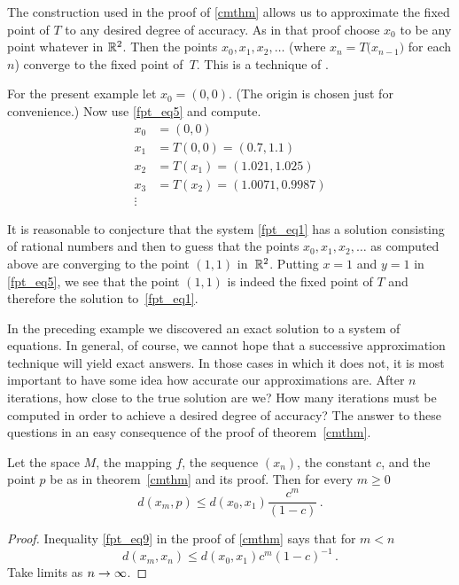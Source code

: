\begin{exam}
The construction used in the proof of \ref{cmthm} allows us to approximate the fixed point of $T$
to any desired degree of accuracy.  As in that proof choose $x_0$ to be any point whatever in
$\mathbb{R}^2$.  Then the points $x_0,x_1,x_2,\dots$ (where $x_n = T\bigl(x_{n-1}\bigr)$ for each $n$)
converge to the fixed point of~$T$.  This is a technique of
.

For the present example let $x_0 = (0,0)$.  (The origin is chosen just for convenience.)  Now use
\eqref{fpt_eq5} and compute.
  \begin{align*}
           x_0 &= (0,0) \\
           x_1 &= T(0,0) = (0.7,1.1) \\
           x_2 &= T(x_1) = (1.021, 1.025) \\
           x_3 &= T(x_2) = (1.0071, 0.9987) \\
        \vdots &{}
  \end{align*}

It is reasonable to conjecture that the system \eqref{fpt_eq1} has a solution consisting of
rational numbers and then to guess that the points $x_0,x_1,x_2,\dots$ as computed above are
converging to the point $(1,1)$ in~$\mathbb{R}^2$.  Putting $x=1$ and $y=1$ in \eqref{fpt_eq5}, we see that
the point $(1,1)$ is indeed the fixed point of $T$ and therefore the solution to~\eqref{fpt_eq1}.
\end{exam}

In the preceding example we discovered an exact solution to a system of equations.  In general, of
course, we cannot hope that a successive approximation technique will yield exact answers.  In
those cases in which it does not, it is most important to have some idea how accurate our
approximations are.  After $n$ iterations, how close to the true solution are we?  How many
iterations must be computed in order to achieve a desired degree of accuracy?  The answer to these
questions in an easy consequence of the proof of theorem~\ref{cmthm}.

\begin{cor}\label{error1} Let the space $M$, the mapping $f$, the sequence $(x_n)$, the constant $c$,
and the point $p$ be as in theorem~\ref{cmthm} and its proof.  Then for every $m \ge 0$
  \[ d(x_m,p) \le d(x_0,x_1)\frac{c^m}{(1 - c)}\,. \]
\end{cor}

\begin{proof} Inequality \eqref{fpt_eq9} in the proof of \ref{cmthm} says that for $m < n$
  \[ d(x_m,x_n) \le d(x_0,x_1)c^m (1 - c)^{-1}\,. \]
Take limits as $n \rightarrow \infty$.
\end{proof}

